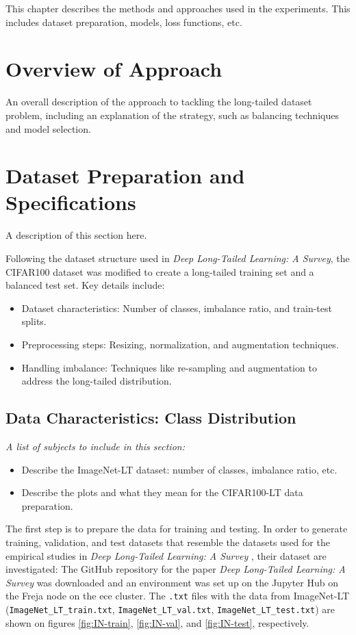 
This chapter describes the methods and approaches used in the experiments. This includes dataset preparation, models, loss functions, etc.

\section{Overview of Approach}
An overall description of the approach to tackling the long-tailed dataset problem, including an explanation of the strategy, 
such as balancing techniques and model selection.

\section{Dataset Preparation and Specifications}
A description of this section here.

Following the dataset structure used in \textit{Deep Long-Tailed Learning: A Survey}, the CIFAR100 dataset was modified to create a long-tailed training set and a balanced test set. Key details include:

\begin{itemize}
    \item Dataset characteristics: Number of classes, imbalance ratio, and train-test splits.
    \item Preprocessing steps: Resizing, normalization, and augmentation techniques.
    \item Handling imbalance: Techniques like re-sampling and augmentation to address the long-tailed distribution.
\end{itemize}

\subsection{Data Characteristics: Class Distribution}
\textit{A list of subjects to include in this section:}

\begin{itemize}
    \item Describe the ImageNet-LT dataset: number of classes, imbalance ratio, etc.
    \item Describe the plots and what they mean for the CIFAR100-LT data preparation. 
\end{itemize}

The first step is to prepare the data for training and testing. In order to generate training, validation, and test datasets that resemble the datasets used for the empirical studies in \textit{Deep Long-Tailed Learning: A Survey} \cite{zhang2023deep}, their dataset are investigated: The GitHub repository \cite{VanintLT} for the paper \textit{Deep Long-Tailed Learning: A Survey} was downloaded and an environment was set up on the Jupyter Hub on the Freja node on the ece cluster. The \texttt{.txt} files with the data from ImageNet-LT (\texttt{ImageNet\_LT\_train.txt}, \texttt{ImageNet\_LT\_val.txt}, \texttt{ImageNet\_LT\_test.txt}) are shown on figures \ref{fig:IN-train}, \ref{fig:IN-val}, and \ref{fig:IN-test}, respectively. 


